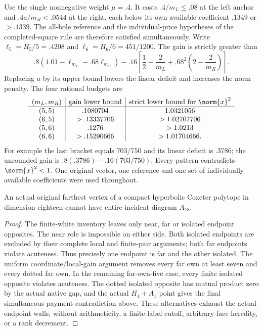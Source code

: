 Use the single nonnegative weight \(\mu=.4\).
It costs \(.4/m_L\leq.08\) at the left anchor and
\(.4a/m_R<.0544\) at the right, each below its own available
coefficient \(.1349\) or \(>.1339\).
The all-hole reference and the individual-price hypotheses of
the completed-square rule are therefore satisfied simultaneously.
Write
\(\ell_5=H_5/5=.4208\) and
\(\ell_6=H_6/6=451/1200\).
The gain is strictly greater than
\[
 .8(1.01-\ell_{m_L}-.68\ell_{m_R})
 -.16\left[\frac12-\frac2{m_L}
             +.68^2\left(2-\frac2{m_R}\right)\right].
\]
Replacing \(a\) by its upper bound lowers the linear deficit
and increases the norm penalty. The four rational budgets are
\[
\begin{array}{c|c|c}
(m_L,m_R)&\text{gain lower bound}&
 \text{strict lower bound for }\norm{x}^2\\ \hline
(5,5)&.1080704&1.0321056\\
(6,5)&>.13337706&>1.02707706\\
(5,6)&.1276&>1.0213\\
(6,6)&>.15290666&>1.01704666 .
\end{array}
\]
For example the last bracket equals \(703/750\) and its
linear deficit is \(.3786\); the unrounded gain is
\(.8(.3786)-.16(703/750)\).
Every pattern contradicts \(\norm{x}^2<1\).
One original vector, one reference and one set of individually
available coefficients were used throughout.

\begin{proposition}\label{app:prop:wholeA18}
An actual original farthest vertex of a compact hyperbolic Coxeter
polytope in dimension eighteen cannot have entire incident diagram
\(A_{18}\).
\end{proposition}
\begin{proof}
The finite-white inventory leaves only near, far or isolated
endpoint opposites. The near role is impossible on either side.
Both isolated endpoints are excluded by their complete local and
finite-pair arguments; both far endpoints violate acuteness.
Thus precisely one endpoint is far and the other isolated.
The uniform coordinate/local-gain argument removes every far
own at least seven and every dotted far own. In the remaining
far-own-five case, every finite isolated opposite violates
acuteness. The dotted isolated opposite has mutual product zero
by the actual native gap, and the actual \(H_4+A_1\) point gives
the final simultaneous-payment contradiction above.
These alternatives exhaust the actual endpoint walls, without
arithmeticity, a finite-label cutoff, arbitrary-face heredity,
or a rank decrement.
\end{proof}





